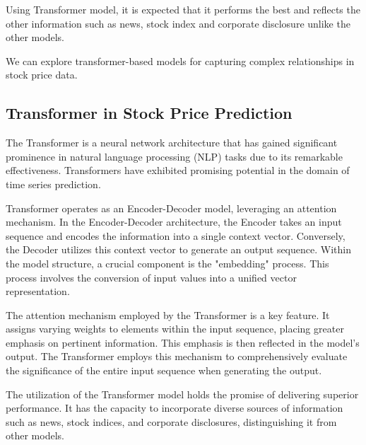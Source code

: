 Using Transformer model, it is expected that it performs the best and reflects the other information such as news, stock index and corporate disclosure unlike the other models.



We can explore transformer-based models for capturing complex relationships in stock price data.


\subsection{Transformer in Stock Price Prediction}

The Transformer is a neural network architecture that has gained significant prominence in natural language processing (NLP) tasks 
due to its remarkable effectiveness. Transformers have exhibited promising potential in the domain of time series prediction.

Transformer operates as an Encoder-Decoder model, leveraging an attention mechanism.
In the Encoder-Decoder architecture, the Encoder takes an input sequence and encodes the information into a single context vector. 
Conversely, the Decoder utilizes this context vector to generate an output sequence.
Within the model structure, a crucial component is the "embedding" process. 
This process involves the conversion of input values into a unified vector representation.

The attention mechanism employed by the Transformer is a key feature. 
It assigns varying weights to elements within the input sequence, placing greater emphasis on pertinent information. 
This emphasis is then reflected in the model's output. 
The Transformer employs this mechanism to comprehensively evaluate the significance of the entire input sequence when generating the output.

The utilization of the Transformer model holds the promise of delivering superior performance. 
It has the capacity to incorporate diverse sources of information such as news, stock indices, and corporate disclosures, distinguishing it from other models.
